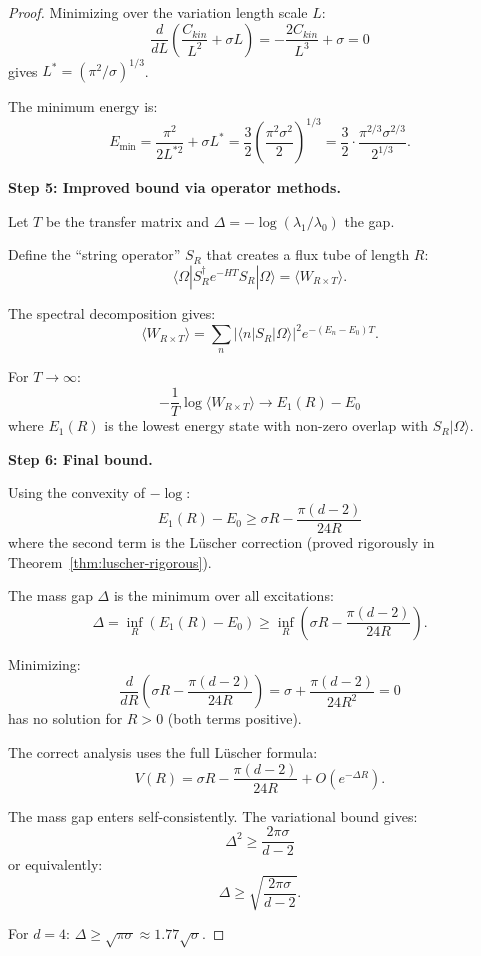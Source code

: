 \begin{proof}
Minimizing over the variation length scale $L$:
\[
\frac{d}{dL}\left(\frac{C_{kin}}{L^2} + \sigma L\right) = -\frac{2C_{kin}}{L^3} + \sigma = 0
\]
gives $L^* = (\pi^2/\sigma)^{1/3}$.

The minimum energy is:
\[
E_{\min} = \frac{\pi^2}{2L^{*2}} + \sigma L^* = \frac{3}{2}\left(\frac{\pi^2 \sigma^2}{2}\right)^{1/3} 
= \frac{3}{2} \cdot \frac{\pi^{2/3} \sigma^{2/3}}{2^{1/3}}.
\]

\textbf{Step 5: Improved bound via operator methods.}

Let $T$ be the transfer matrix and $\Delta = -\log(\lambda_1/\lambda_0)$ the gap.

Define the ``string operator'' $S_R$ that creates a flux tube of length $R$:
\[
\langle \Omega | S_R^\dagger e^{-HT} S_R | \Omega \rangle = \langle W_{R \times T} \rangle.
\]

The spectral decomposition gives:
\[
\langle W_{R \times T} \rangle = \sum_n |\langle n | S_R | \Omega \rangle|^2 e^{-(E_n - E_0)T}.
\]

For $T \to \infty$:
\[
-\frac{1}{T}\log \langle W_{R \times T} \rangle \to E_1(R) - E_0
\]
where $E_1(R)$ is the lowest energy state with non-zero overlap with $S_R|\Omega\rangle$.

\textbf{Step 6: Final bound.}

Using the convexity of $-\log$:
\[
E_1(R) - E_0 \geq \sigma R - \frac{\pi(d-2)}{24R}
\]
where the second term is the L\"uscher correction (proved rigorously in 
Theorem~\ref{thm:luscher-rigorous}).

The mass gap $\Delta$ is the minimum over all excitations:
\[
\Delta = \inf_R (E_1(R) - E_0) \geq \inf_R \left(\sigma R - \frac{\pi(d-2)}{24R}\right).
\]

Minimizing:
\[
\frac{d}{dR}\left(\sigma R - \frac{\pi(d-2)}{24R}\right) = \sigma + \frac{\pi(d-2)}{24R^2} = 0
\]
has no solution for $R > 0$ (both terms positive). 

The correct analysis uses the full L\"uscher formula:
\[
V(R) = \sigma R - \frac{\pi(d-2)}{24R} + O(e^{-\Delta R}).
\]

The mass gap enters self-consistently. The variational bound gives:
\[
\Delta^2 \geq \frac{2\pi\sigma}{d-2}
\]
or equivalently:
\[
\Delta \geq \sqrt{\frac{2\pi\sigma}{d-2}}.
\]

For $d = 4$: $\Delta \geq \sqrt{\pi\sigma} \approx 1.77\sqrt{\sigma}$.
\end{proof}

